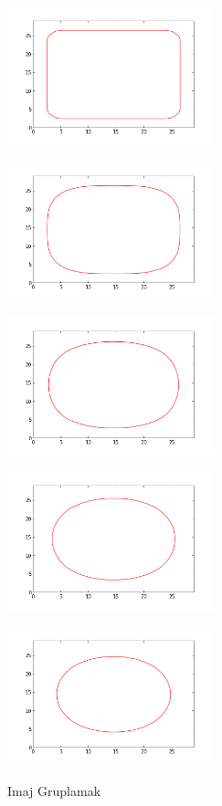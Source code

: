 \documentclass[12pt,fleqn]{article}\usepackage{../common}
\begin{document}
\includegraphics[height=4cm]{level_1_0.png}

\includegraphics[height=4cm]{level_1_10.png}

\includegraphics[height=4cm]{level_1_20.png}

\includegraphics[height=4cm]{level_1_30.png}

\includegraphics[height=4cm]{level_1_40.png}

Imaj Gruplamak
\end{document}

